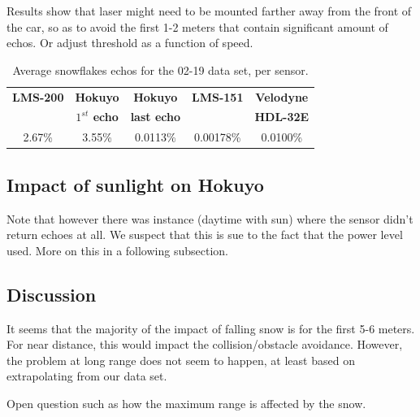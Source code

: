 Results show that laser might need to be mounted farther away from the front of the car, so as to avoid the first 1-2 meters that contain significant amount of echos. Or adjust threshold as a function of speed.

\begin{table}[htbp]
    \centering
    \begin{tabular}{|c|c|c|c|c|}
        \hline
        \textbf{LMS-200}       & \textbf{Hokuyo}             & \textbf{Hokuyo}    & \textbf{LMS-151}  & \textbf{Velodyne}  \\
                                        & \textbf{$1^{st}$ echo}   & \textbf{last echo}  &                            & \textbf{HDL-32E}  \\\hline
                 2.67\%            &           3.55\%                &       0.0113\%      &       0.00178\%     &  0.0100\%  \\\hline
    \end{tabular}
    \caption{Average snowflakes echos for the 02-19 data set, per sensor.}
    \label{tab:avgRates}
\end{table}

\subsection{Impact of sunlight on Hokuyo}

Note that however there was instance (daytime with sun) where the sensor didn't return echoes at all. We suspect that this is sue to the fact that the power level used. More on this in a following subsection.

\subsection{Discussion}
It seems that the majority of the impact of falling snow is for the first 5-6 meters. For near distance, this would impact the collision/obstacle avoidance. However, the problem at long range does not seem to happen, at least based on extrapolating from our data set.

Open question such as how the maximum range is affected by the snow.

